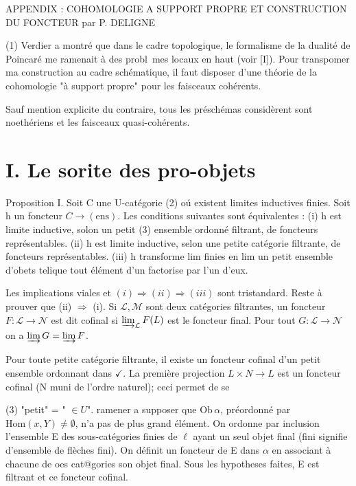 \documentclass[12pt]{article}
\begin{document}
APPENDIX : COHOMOLOGIE A SUPPORT PROPRE ET CONSTRUCTION DU FONCTEUR
par P. DELIGNE

(1) Verdier a montré que dans le cadre topologique, le formalisme de la dualité de Poincaré me ramenait à des probl~mes locaux en haut (voir [I]). Pour transpomer ma construction au cadre schématique, il faut disposer d'une théorie de la cohomologie "à support propre" pour les faisceaux cohérents.

Sauf mention explicite du contraire, tous les préschémas considèrent sont noethériens et les faisceaux quasi-cohérents.

\section{I. Le sorite des pro-objets}
Proposition I. Soit C une U-catégorie (2) oú existent limites inductives finies. Soit h un foncteur $C \to (\text{ens})$. Les conditions suivantes sont équivalentes :
(i) h est limite inductive, solon un petit (3) ensemble ordonné filtrant, de foncteurs représentables.
(ii) h est limite inductive, selon une petite catégorie filtrante, de foncteurs représentables.
(iii) h transforme lim finies en lim un petit ensemble d'obets telique tout élément d'un factorise par l'un d'eux.

Les implications viales et $(i) \Rightarrow (ii) \Rightarrow (iii)$ sont tristandard. Reste à prouver que (ii) $\Rightarrow$ (i).
Si $\mathcal{L},\mathcal{M}$ sont deux catégories filtrantes, un foncteur $F: \mathcal{L} \to \mathcal{N}$ est dit cofinal si $\varinjlim_{\mathcal{L}} F(L)$ est le foncteur final. Pour tout $G: \mathcal{L} \to \mathcal{N}$ on a $\varinjlim G = \varinjlim F$.

Pour toute petite catégorie filtrante, il existe un foncteur cofinal d'un petit ensemble ordonnant dans $\checkmark$.
La première projection $L \times N \to L$ est un foncteur cofinal (N muni de l'ordre naturel); ceci permet de se

(3) "petit" = " $\in U$".
ramener a supposer que $\mathrm{Ob}\,\alpha$, préordonné par $\mathrm{Hom}(x,Y) \neq\emptyset$, n'a pas de plus grand élément.
On ordonne par inclusion l'ensemble E des sous-catégories finies de $\ell$ ayant un seul objet final (fini signifie d'ensemble de flèches fini).
On définit un foncteur de E dans $\alpha$ en associant à chacune de oes cat@gories son objet final.
Sous les hypotheses faites, E est filtrant et ce foncteur cofinal.
\end{document}

